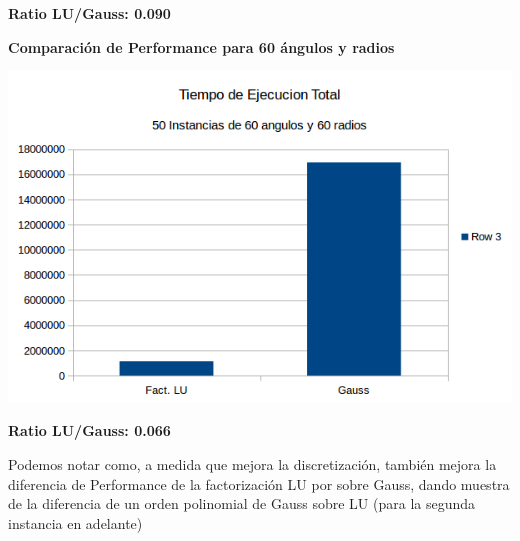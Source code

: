  \textbf{Ratio LU/Gauss: 0.090}

  	\textbf{Comparaci\'on de Performance para 60 \'angulos y radios }\\
\begin{center}
\includegraphics[scale=0.7]{experimentos2a_2b/2b6060.png}
\end{center}

 \textbf{Ratio LU/Gauss: 0.066}

Podemos notar como, a medida que mejora la discretizaci\'on, tambi\'en mejora la diferencia de Performance de la factorizaci\'on LU por sobre Gauss, dando muestra de la diferencia de un orden polinomial de Gauss sobre LU (para la segunda instancia en adelante)



